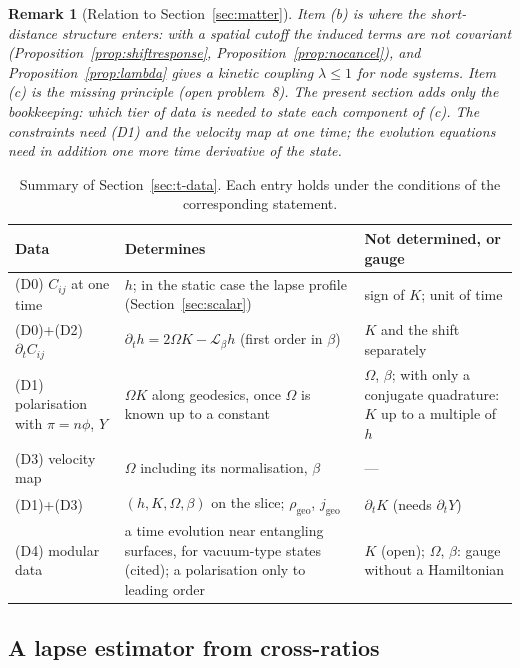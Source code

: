 \documentclass[11pt,a4paper]{article}
\theoremstyle{stmt}
\theoremstyle{defn}
\theoremstyle{rmk}
\newtheorem{remark}[theorem]{Remark}
\numberwithin{equation}{section}
\newcommand{\Lie}{\mathcal{L}}
\begin{document}
{\begin{remark}[Relation to Section~\ref{sec:matter}]
Item (b) is where the short-distance structure enters: with a spatial cutoff the induced terms are not covariant (Proposition~\ref{prop:shiftresponse}, Proposition~\ref{prop:nocancel}), and Proposition~\ref{prop:lambda} gives a kinetic coupling $\lambda\le1$ for node systems. Item (c) is the missing principle (open problem~8). The present section adds only the bookkeeping: which tier of data is needed to \emph{state} each component of (c). The constraints need \textup{(D1)} and the velocity map at one time; the evolution equations need in addition one more time derivative of the state.
\end{remark}

\begin{table}[ht]
\centering\small
\begin{tabular}{@{}p{}p{}p{}@{}}
\toprule
Data & Determines & Not determined, or gauge\\
\midrule
(D0) $C_{ij}$ at one time & $h$; in the static case the lapse profile (Section~\ref{sec:scalar}) & sign of $K$; unit of time\\
(D0)+(D2) $\partial_tC_{ij}$ & $\partial_th=2\Omega K-\Lie_\beta h$ (first order in $\beta$) & $K$ and the shift separately\\
(D1) polarisation with $\pi=n\phi$, $Y$ & $\Omega K$ along geodesics, once $\Omega$ is known up to a constant & $\Omega$, $\beta$; with only a conjugate quadrature: $K$ up to a multiple of $h$\\
(D3) velocity map & $\Omega$ including its normalisation, $\beta$ & ---\\
(D1)+(D3) & $(h,K,\Omega,\beta)$ on the slice; $\rho_{\mathrm{geo}}$, $j_{\mathrm{geo}}$ & $\partial_tK$ (needs $\partial_tY$)\\
(D4) modular data & a time evolution near entangling surfaces, for vacuum-type states (cited); a polarisation only to leading order & $K$ (open); $\Omega$, $\beta$: gauge without a Hamiltonian\\
\bottomrule
\end{tabular}
\caption{Summary of Section~\ref{sec:t-data}. Each entry holds under the conditions of the corresponding statement.}
\end{table}

\subsection{A lapse estimator from cross-ratios}\label{sec:t-lapse}

}
\end{document}
